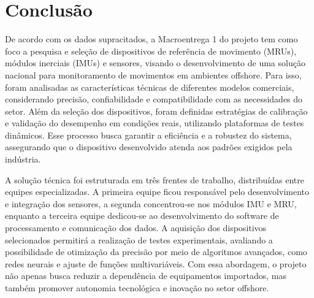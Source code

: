 \documentclass[a4paper, 12pt]{article}
\begin{document}
\section{Conclusão}
    De acordo com os dados supracitados, a Macroentrega 1 do projeto tem como foco a pesquisa e seleção de dispositivos de referência de movimento (MRUs), módulos inerciais (IMUs) e sensores, visando o desenvolvimento de uma solução nacional para monitoramento de movimentos em ambientes offshore. Para isso, foram analisadas as características técnicas de diferentes modelos comerciais, considerando precisão, confiabilidade e compatibilidade com as necessidades do setor. Além da seleção dos dispositivos, foram definidas estratégias de calibração e validação do desempenho em condições reais, utilizando plataformas de testes dinâmicos. Esse processo busca garantir a eficiência e a robustez do sistema, assegurando que o dispositivo desenvolvido atenda aos padrões exigidos pela indústria.

    A solução técnica foi estruturada em três frentes de trabalho, distribuídas entre equipes especializadas. A primeira equipe ficou responsável pelo desenvolvimento e integração dos sensores, a segunda concentrou-se nos módulos IMU e MRU, enquanto a terceira equipe dedicou-se ao desenvolvimento do software de processamento e comunicação dos dados. A aquisição dos dispositivos selecionados permitirá a realização de testes experimentais, avaliando a possibilidade de otimização da precisão por meio de algoritmos avançados, como redes neurais e ajuste de funções multivariáveis. Com essa abordagem, o projeto não apenas busca reduzir a dependência de equipamentos importados, mas também promover autonomia tecnológica e inovação no setor offshore.
    

    \newpage
    
\end{document}
